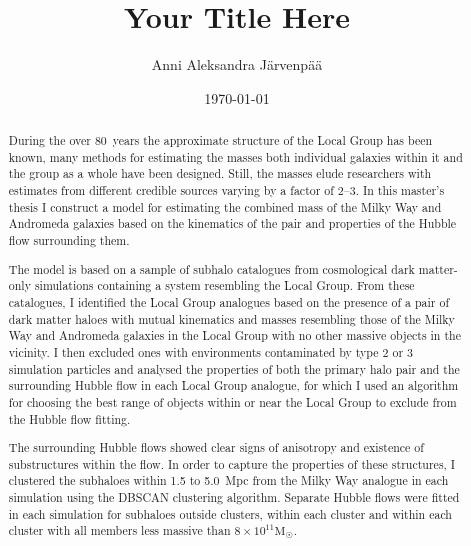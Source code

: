 \documentclass[english, twoside]{HYgradu}
\title{Your Title Here}
\author{Anni Aleksandra Järvenpää}
\date{\today}
\begin{document}
\maketitle

\onehalfspacing

\begin{abstract}
During the over 80~years the approximate structure of the Local Group has been known, many methods for estimating the masses both individual galaxies within it and the group as a whole have been designed. Still, the masses elude researchers with estimates from different credible sources varying by a factor of 2--3. In this master's thesis I construct a model for estimating the combined mass of the Milky Way and Andromeda galaxies based on the kinematics of the pair and properties of the Hubble flow surrounding them.

The model is based on a sample of subhalo catalogues from cosmological dark matter-only simulations containing a system resembling the Local Group. From these catalogues, I identified the Local Group analogues based on the presence of a pair of dark matter haloes with mutual kinematics and masses resembling those of the Milky Way and Andromeda galaxies in the Local Group with no other massive objects in the vicinity. I then excluded ones with environments contaminated by type 2 or 3 simulation particles and analysed the properties of both the primary halo pair and the surrounding Hubble flow in each Local Group analogue, for which I used an algorithm for choosing the best range of objects within or near the Local Group to exclude from the Hubble flow fitting.

The surrounding Hubble flows showed clear signs of anisotropy and existence of substructures within the flow. In order to capture the properties of these structures, I clustered the subhaloes within 1.5 to 5.0~Mpc from the Milky Way analogue in each simulation using the DBSCAN clustering algorithm. Separate Hubble flows were fitted in each simulation for subhaloes outside clusters, within each cluster and within each cluster with all members less massive than $8 \times 10^{11} \mathrm{M}_{\astrosun}$.


\end{abstract}
\end{document}

